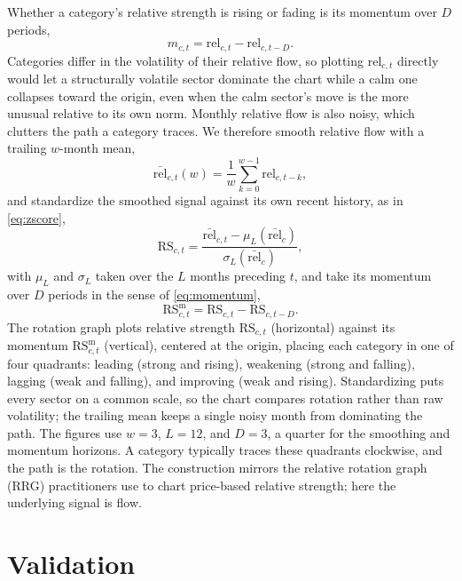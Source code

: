 \documentclass[11pt]{article}
\begin{document}
Whether a category's relative strength is rising or fading is its momentum over $D$ periods,
\begin{equation}
\label{eq:momentum}
m_{c,t} = \mathrm{rel}_{c,t} - \mathrm{rel}_{c,t-D}.
\end{equation}
Categories differ in the volatility of their relative flow, so plotting
$\mathrm{rel}_{c,t}$ directly would let a structurally volatile sector dominate the chart
while a calm one collapses toward the origin, even when the calm sector's move is the more
unusual relative to its own norm. Monthly relative flow is also noisy, which clutters the
path a category traces. We therefore smooth relative flow with a trailing $w$-month mean,
\begin{equation}
\label{eq:rel_smoothed}
\bar{\mathrm{rel}}_{c,t}(w) = \frac{1}{w}\sum_{k=0}^{w-1}\mathrm{rel}_{c,t-k},
\end{equation}
and standardize the smoothed signal against its own recent history, as in \eqref{eq:zscore},
\begin{equation}
\label{eq:rs_ratio}
\mathrm{RS}_{c,t} =
\frac{\bar{\mathrm{rel}}_{c,t} - \mu_L(\bar{\mathrm{rel}}_c)}{\sigma_L(\bar{\mathrm{rel}}_c)},
\end{equation}
with $\mu_L$ and $\sigma_L$ taken over the $L$ months preceding $t$, and take its momentum
over $D$ periods in the sense of \eqref{eq:momentum},
\begin{equation}
\label{eq:rs_momentum}
\mathrm{RS}^{\mathrm{m}}_{c,t} = \mathrm{RS}_{c,t} - \mathrm{RS}_{c,t-D}.
\end{equation}
The rotation graph plots relative strength $\mathrm{RS}_{c,t}$ (horizontal) against its
momentum $\mathrm{RS}^{\mathrm{m}}_{c,t}$ (vertical), centered at the origin, placing each
category in one of four quadrants: leading (strong and rising), weakening (strong and
falling), lagging (weak and falling), and improving (weak and rising). Standardizing puts
every sector on a common scale, so the chart compares rotation rather than raw volatility;
the trailing mean keeps a single noisy month from dominating the path. The figures use
$w=3$, $L=12$, and $D=3$, a quarter for the smoothing and momentum horizons. A category
typically traces these quadrants clockwise, and the path is the rotation. The
construction mirrors the relative rotation graph (RRG) practitioners use to chart
price-based relative strength; here the underlying signal is flow.

\section{Validation}
\label{sec:validation}
\end{document}
